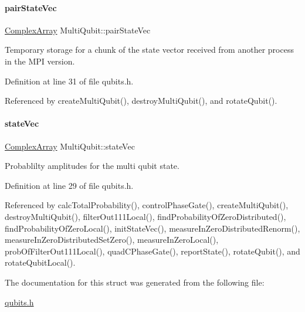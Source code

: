 \mbox{\label{structMultiQubit_a76f7db4eab52d2b30f58f973ada809c5}} 
\paragraph{\texorpdfstring{pair\+State\+Vec}{pairStateVec}}
{\footnotesize\ttfamily \hyperlink{structComplexArray}{Complex\+Array} Multi\+Qubit\+::pair\+State\+Vec}



Temporary storage for a chunk of the state vector received from another process in the M\+PI version. 



Definition at line 31 of file qubits.\+h.



Referenced by create\+Multi\+Qubit(), destroy\+Multi\+Qubit(), and rotate\+Qubit().

\mbox{\label{structMultiQubit_a45483190d6b01ef6b2f98f2bec9ab94f}} 
\paragraph{\texorpdfstring{state\+Vec}{stateVec}}
{\footnotesize\ttfamily \hyperlink{structComplexArray}{Complex\+Array} Multi\+Qubit\+::state\+Vec}



Probablilty amplitudes for the multi qubit state. 



Definition at line 29 of file qubits.\+h.



Referenced by calc\+Total\+Probability(), control\+Phase\+Gate(), create\+Multi\+Qubit(), destroy\+Multi\+Qubit(), filter\+Out111\+Local(), find\+Probability\+Of\+Zero\+Distributed(), find\+Probability\+Of\+Zero\+Local(), init\+State\+Vec(), measure\+In\+Zero\+Distributed\+Renorm(), measure\+In\+Zero\+Distributed\+Set\+Zero(), measure\+In\+Zero\+Local(), prob\+Of\+Filter\+Out111\+Local(), quad\+C\+Phase\+Gate(), report\+State(), rotate\+Qubit(), and rotate\+Qubit\+Local().



The documentation for this struct was generated from the following file\+:\begin{DoxyCompactItemize}
\item 
\hyperlink{qubits_8h}{qubits.\+h}\end{DoxyCompactItemize}
